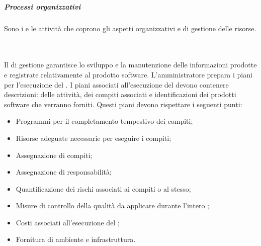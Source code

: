 \subparagraph{Processi organizzativi}
Sono i  e le attività che coprono gli aspetti organizzativi e di gestione delle risorse.

\mbox{}\\ \\
Il  di gestione garantisce lo sviluppo e la manutenzione delle informazioni prodotte e registrate relativamente 
al prodotto software. L'amministratore prepara i piani per l'esecuzione del .
I piani associati all'esecuzione del  devono contenere descrizioni: delle attività, dei compiti associati e
identificazioni dei prodotti software che verranno forniti. Questi piani devono rispettare i seguenti punti:
\begin{itemize}
    \item Programmi per il completamento tempestivo dei compiti;
    \item Risorse adeguate necessarie per eseguire i compiti;
    \item Assegnazione di compiti;
    \item Assegnazione di responsabilità;
    \item Quantificazione dei rischi associati ai compiti o al  stesso;
    \item Misure di controllo della qualità da applicare durante l'intero ;
    \item Costi associati all'esecuzione del ;
    \item Fornitura di ambiente e infrastruttura.
\end{itemize}
